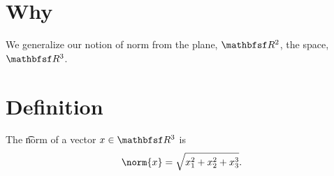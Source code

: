 
\section*{Why}

We generalize our notion of norm from the plane, $\R ^2$, the space, $\R ^3$.

\section*{Definition}

The \t{norm} of a vector $x \in \R ^3$ is
  \[
\norm{x} = \sqrt{x_1^2 + x_2^2 + x_3^3}.
  \]

\blankpage